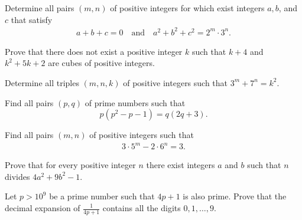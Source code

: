 \documentclass[problems.tex]{subfile}
\begin{document}
	
	\begin{problem}
		Determine all pairs $(m, n)$ of positive integers for which exist integers $a, b$, and $c$ that satisfy
		\begin{align*}
			a+b+c=0 \quad \text{and} \quad a^2+b^2+c^2=2^m \cdot 3^n.
		\end{align*}
	\end{problem}
	
	
	
	
	\begin{problem}
		Prove that there does not exist a positive integer $k$ such that $k + 4$ and $k^2 + 5k + 2$ are cubes of positive integers.
	\end{problem}
	
	
	
	
	\begin{problem}
		Determine all triples $(m, n, k)$ of positive integers such that $3^m + 7^n = k^2$.
	\end{problem}
	
	
	
	
	\begin{problem}
		Find all pairs $(p,q)$ of prime numbers such that
		$$ p(p^2 - p - 1) = q(2q + 3) .$$
	\end{problem}
	
	
	
	
	\begin{problem}
		Find all pairs $(m, n)$ of positive integers such that
		\begin{align*}
			3 \cdot 5^m - 2\cdot 6^n = 3.
		\end{align*}
	\end{problem}
	
	
	
	
	\begin{problem}
		Prove that for every positive integer $n$ there exist integers $a$ and $b$ such that $n$ divides $4a^2 + 9b^2 - 1$.
	\end{problem}
	
	
	
	\begin{problem}
		Let $p > 10^9$ be a prime number such that $4p + 1$ is also prime.
		Prove that the decimal expansion of $\frac{1}{4p+1}$ contains all the digits $0,1, \ldots, 9$. %
	\end{problem}
	
\end{document}
